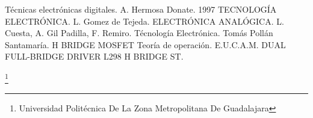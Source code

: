 \documentclass[10pt,a4paper]{article}
\begin{document}

\begin{thebibliography}{X}
 Técnicas electrónicas digitales. A. Hermosa Donate. 1997
TECNOLOGÍA ELECTRÓNICA. L. Gomez de Tejeda.
ELECTRÓNICA ANALÓGICA. L. Cuesta, A. Gil Padilla, F. Remiro.
Técnología Electrónica. Tomás Pollán Santamaría.
H BRIDGE MOSFET Teoría de operación. E.U.C.A.M.
DUAL FULL-BRIDGE DRIVER L298 H BRIDGE ST. 
\end{thebibliography}


\footnote{Universidad Politécnica De La Zona Metropolitana De Guadalajara}
\end{document}
